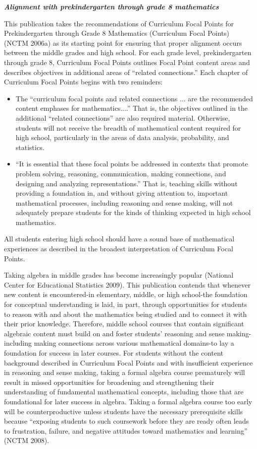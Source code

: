 \documentclass[
  10pt,
  a4paper,
  landscape,
  twoside,
  openany
]{scrbook}
\newcommand{\EN}[1]{#1}
\begin{document}
\TriPara
{
\EN{
\noindent
\textbf{\emph{Alignment with prekindergarten through grade 8 mathematics}}

This publication takes the recommendations of Curriculum Focal Points for Prekindergarten through Grade 8 Mathematics (Curriculum Focal Points) (NCTM 2006a) as its starting point for ensuring that proper alignment occurs between the middle grades and high school. For each grade level, prekindergarten through grade 8, Curriculum Focal Points outlines Focal Point content areas and describes objectives in additional areas of “related connections.” Each chapter of Curriculum
Focal Points begins with two reminders:

\begin{itemize}
  \item The ``curriculum focal points and related connections ... are the recommended content emphases for mathematics....'' That is, the objectives outlined in the additional ``related connections'' are also required material. Otherwise, students will not receive the breadth of mathematical content required for high school, particularly in the areas of data analysis, probability, and statistics.
  \item ``It is essential that these focal points be addressed in contexts that promote problem solving, reasoning, communication, making connections, and designing and analyzing representations.'' That is, teaching skills without providing a foundation in, and without giving attention to, important mathematical processes, including reasoning and sense making, will not adequately prepare students for the kinds of thinking expected in high school mathematics.
\end{itemize}

All students entering high school should have a sound base of mathematical experiences as described in the broadest interpretation of Curriculum Focal Points. 

Taking algebra in middle grades has become increasingly popular (National Center for Educational Statistics 2009). This publication contends that whenever new content is encountered-in elementary, middle, or high school-the foundation for conceptual understanding is laid, in part, through opportunities for students to reason with and about the mathematics being studied and to connect it with their prior knowledge. Therefore, middle school courses that contain significant algebraic content must build on and foster students' reasoning and sense making-including making connections across various mathematical domains-to lay a foundation for success in later courses. For students without the content background described in Curriculum Focal Points and with insufficient experience in reasoning and sense making, taking a formal algebra course prematurely will result in missed opportunities for broadening and strengthening their understanding of fundamental mathematical concepts, including those that are foundational for later success in algebra. Taking a formal algebra course too early will be counterproductive unless students have the necessary prerequisite skills because ``exposing students to such coursework before they are ready often leads to frustration, failure, and negative attitudes toward mathematics and learning'' (NCTM 2008).}
}
\end{document}
